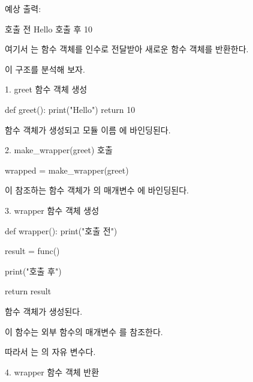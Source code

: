 예상 출력:

\begin{dhkzsh}
호출 전
Hello
호출 후
10
\end{dhkzsh}

여기서 는 함수 객체를 인수로 전달받아 새로운 함수 객체를 반환한다.

이 구조를 분석해 보자.

\begin{dhknote}
\begin{dhksmry}[centered]
1. greet 함수 객체 생성
\end{dhksmry}
\end{dhknote}

\begin{dhkcode}
def greet():
    print("Hello")
    return 10
\end{dhkcode}

 함수 객체가 생성되고 모듈 이름 에 바인딩된다.

\begin{dhknote}
\begin{dhksmry}[centered]
2. make_wrapper(greet) 호출
\end{dhksmry}
\end{dhknote}

\begin{dhkcode}
wrapped = make_wrapper(greet)
\end{dhkcode}

이 참조하는 함수 객체가 의 매개변수 에 바인딩된다.

\begin{dhknote}
\begin{dhksmry}[centered]
3. wrapper 함수 객체 생성
\end{dhksmry}
\end{dhknote}

\begin{dhkcode}
def wrapper():
    print("호출 전")

    result = func()

    print("호출 후")

    return result
\end{dhkcode}

 함수 객체가 생성된다.

이 함수는 외부 함수의 매개변수 를 참조한다.

따라서 는 의 자유 변수다.

\begin{dhknote}
\begin{dhksmry}[centered]
4. wrapper 함수 객체 반환
\end{dhksmry}
\end{dhknote}

